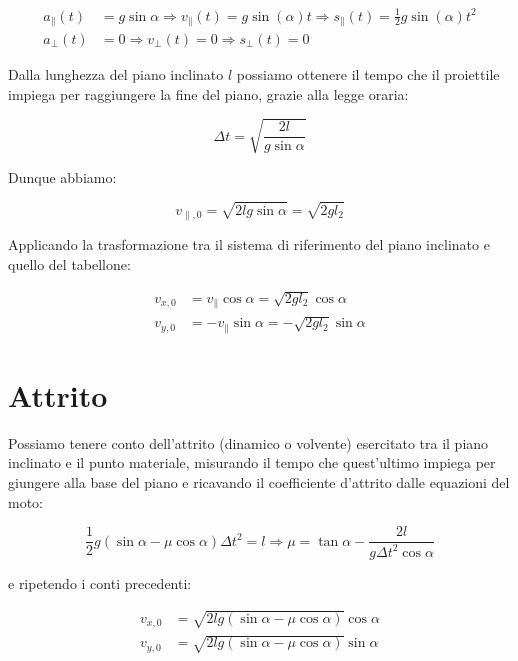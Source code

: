 \documentclass{article}
\begin{document}
\begin{align}
a_\parallel(t) &= g \sin\alpha \Rightarrow v_\parallel(t) = g \sin(\alpha) t \Rightarrow s_\parallel(t) = \frac{1}{2} g \sin(\alpha) t^2 \\
a_\perp(t) &= 0 \Rightarrow v_\perp(t) = 0 \Rightarrow s_\perp(t) = 0
\end{align}

Dalla lunghezza del piano inclinato $l$ possiamo ottenere il tempo che il proiettile
impiega per raggiungere la fine del piano, grazie alla legge oraria:

\begin{equation}
\Delta t = \sqrt{\frac{2l}{g\sin{\alpha}}}
\end{equation}

Dunque abbiamo:

\begin{equation}
v_{\parallel,0} = \sqrt{2lg\sin{\alpha}} = \sqrt{2gl_2}
\end{equation}

Applicando la trasformazione tra il sistema di riferimento del piano inclinato
e quello del tabellone:

\begin{align}
v_{x,0} &= v_\parallel\cos\alpha = \sqrt{2gl_2} \cos\alpha \\
v_{y,0} &= -v_\parallel\sin\alpha = -\sqrt{2gl_2} \sin\alpha 
\end{align}

\section{Attrito}
Possiamo tenere conto dell'attrito (dinamico o volvente) esercitato tra il piano inclinato e il punto
materiale, misurando il tempo che quest'ultimo impiega per giungere alla base del piano e ricavando
il coefficiente d'attrito dalle equazioni del moto:

\begin{equation}
\frac{1}{2} g (\sin\alpha - \mu\cos\alpha) \Delta t^2 = l \Rightarrow \mu = \tan\alpha - \frac{2l}{g\Delta t^2 \cos\alpha} 
\end{equation}

e ripetendo i conti precedenti:

\begin{align}
v_{x,0} &= \sqrt{2lg (\sin{\alpha} - \mu \cos\alpha)} \cos\alpha \\
v_{y,0} &= \sqrt{2lg (\sin{\alpha} - \mu \cos\alpha)} \sin\alpha
\end{align}

{}

\end{document}

